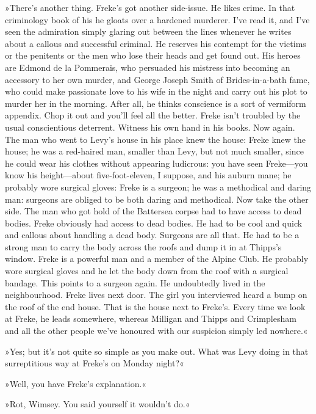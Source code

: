 »There's another thing. Freke's got another side-issue. He likes crime. In that criminology book of his he gloats over a hardened murderer. I've read it, and I've seen the admiration simply glaring out between the lines whenever he writes about a callous and successful criminal. He reserves his contempt for the victims or the penitents or the men who lose their heads and get found out. His heroes are Edmond de la Pommerais, who persuaded his mistress into becoming an accessory to her own murder, and George Joseph Smith of Brides-in-a-bath fame, who could make passionate love to his wife in the night and carry out his plot to murder her in the morning. After all, he thinks conscience is a sort of vermiform appendix. Chop it out and you'll feel all the better. Freke isn't troubled by the usual conscientious deterrent. Witness his own hand in his books. Now again. The man who went to Levy's house in his place knew the house: Freke knew the house; he was a red-haired man, smaller than Levy, but not much smaller, since he could wear his clothes without appearing ludicrous: you have seen Freke\allowbreak---\allowbreak you know his height\allowbreak---\allowbreak about five-foot-eleven, I suppose, and his auburn mane; he probably wore surgical gloves: Freke is a surgeon; he was a methodical and daring man: surgeons are obliged to be both daring and methodical. Now take the other side. The man who got hold of the Battersea corpse had to have access to dead bodies. Freke obviously had access to dead bodies. He had to be cool and quick and callous about handling a dead body. Surgeons are all that. He had to be a strong man to carry the body across the roofs and dump it in at Thipps's window. Freke is a powerful man and a member of the Alpine Club. He probably wore surgical gloves and he let the body down from the roof with a surgical bandage. This points to a surgeon again. He undoubtedly lived in the neighbourhood. Freke lives next door. The girl you interviewed heard a bump on the roof of the end house. That is the house next to Freke's. Every time we look at Freke, he leads somewhere, whereas Milligan and Thipps and Crimplesham and all the other people we've honoured with our suspicion simply led nowhere.«

»Yes; but it's not quite so simple as you make out. What was Levy doing in that surreptitious way at Freke's on Monday night?«

»Well, you have Freke's explanation.«

»Rot, Wimsey. You said yourself it wouldn't do.«

